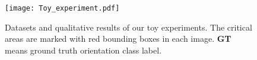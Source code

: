 \documentclass[10pt,twocolumn,letterpaper]{article}
\begin{document}




\begin{figure}%
\centering
\texttt{[image: Toy\_experiment.pdf]} %
\caption{Datasets and qualitative results of our toy experiments. The critical areas are marked with red bounding boxes in each image. \textbf{GT} means ground truth orientation class label.}
\label{fig:toy_experients} 
\end{figure} 
\end{document}
